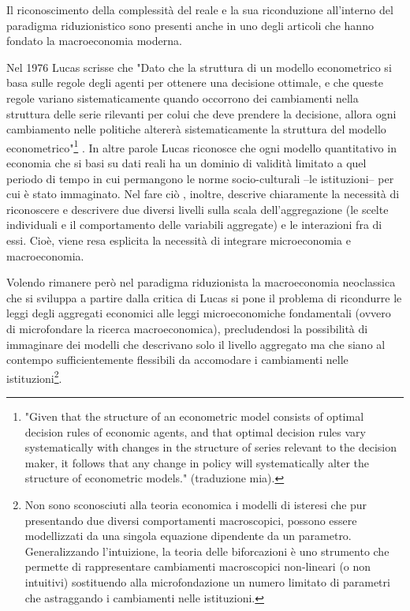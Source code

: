 \documentclass[a4paper, headings=standardclasses]{scrartcl}
\begin{document}
Il riconoscimento della complessità del reale e la sua riconduzione all'interno del paradigma riduzionistico sono presenti anche in uno degli articoli che hanno fondato la macroeconomia moderna.

Nel 1976 Lucas scrisse che "Dato che la struttura di un modello econometrico si basa sulle regole degli agenti per ottenere una decisione ottimale, e che queste regole variano sistematicamente quando occorrono dei cambiamenti nella struttura delle serie rilevanti per colui che deve prendere la decisione, allora ogni cambiamento nelle politiche altererà sistematicamente la struttura del modello econometrico"\footnote{"Given that the structure of an econometric model consists of optimal decision rules of economic agents, and that optimal decision rules vary systematically with changes in the structure of series relevant to the decision maker, it follows that any change in policy will systematically alter the structure of econometric models." (traduzione mia).} \parencite{lucas1976}.
In altre parole Lucas riconosce che ogni modello quantitativo in economia che si basi su dati reali ha un dominio di validità limitato a quel periodo di tempo in cui permangono le norme socio-culturali --le istituzioni-- per cui è stato immaginato.
Nel fare ciò , inoltre, descrive chiaramente la necessità di riconoscere e descrivere due diversi livelli sulla scala dell'aggregazione (le scelte individuali e il comportamento delle variabili aggregate) e le interazioni fra di essi. Cioè, viene resa esplicita la necessità di integrare microeconomia e macroeconomia.

Volendo rimanere però nel paradigma riduzionista la macroeconomia neoclassica che si sviluppa a partire dalla critica di Lucas si pone il problema di ricondurre le leggi degli aggregati economici alle leggi microeconomiche fondamentali (ovvero di microfondare la ricerca macroeconomica), precludendosi la possibilità di immaginare dei modelli che descrivano solo il livello aggregato ma che siano al contempo sufficientemente flessibili da accomodare i cambiamenti nelle istituzioni\footnote{Non sono sconosciuti alla teoria economica i modelli di isteresi che pur presentando due diversi comportamenti macroscopici, possono essere modellizzati da una singola equazione dipendente da un parametro. Generalizzando l'intuizione, la teoria delle biforcazioni è uno strumento che permette di rappresentare cambiamenti macroscopici non-lineari (o non intuitivi) sostituendo alla microfondazione un numero limitato di parametri che astraggando i cambiamenti nelle istituzioni.}.
\end{document}
